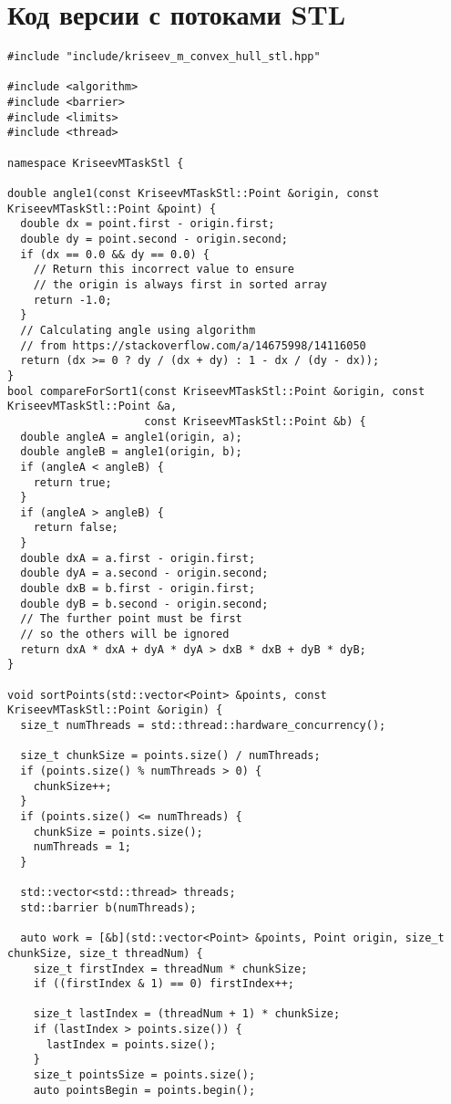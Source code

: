 \documentclass[a4paper]{article}
\begin{document}
\section{Код версии с потоками STL}

\begin{lstlisting}
#include "include/kriseev_m_convex_hull_stl.hpp"

#include <algorithm>
#include <barrier>
#include <limits>
#include <thread>

namespace KriseevMTaskStl {

double angle1(const KriseevMTaskStl::Point &origin, const KriseevMTaskStl::Point &point) {
  double dx = point.first - origin.first;
  double dy = point.second - origin.second;
  if (dx == 0.0 && dy == 0.0) {
    // Return this incorrect value to ensure 
    // the origin is always first in sorted array
    return -1.0;
  }
  // Calculating angle using algorithm 
  // from https://stackoverflow.com/a/14675998/14116050
  return (dx >= 0 ? dy / (dx + dy) : 1 - dx / (dy - dx));
}
bool compareForSort1(const KriseevMTaskStl::Point &origin, const KriseevMTaskStl::Point &a,
                     const KriseevMTaskStl::Point &b) {
  double angleA = angle1(origin, a);
  double angleB = angle1(origin, b);
  if (angleA < angleB) {
    return true;
  }
  if (angleA > angleB) {
    return false;
  }
  double dxA = a.first - origin.first;
  double dyA = a.second - origin.second;
  double dxB = b.first - origin.first;
  double dyB = b.second - origin.second;
  // The further point must be first
  // so the others will be ignored
  return dxA * dxA + dyA * dyA > dxB * dxB + dyB * dyB;
}

void sortPoints(std::vector<Point> &points, const KriseevMTaskStl::Point &origin) {
  size_t numThreads = std::thread::hardware_concurrency();

  size_t chunkSize = points.size() / numThreads;
  if (points.size() % numThreads > 0) {
    chunkSize++;
  }
  if (points.size() <= numThreads) {
    chunkSize = points.size();
    numThreads = 1;
  }

  std::vector<std::thread> threads;
  std::barrier b(numThreads);

  auto work = [&b](std::vector<Point> &points, Point origin, size_t chunkSize, size_t threadNum) {
    size_t firstIndex = threadNum * chunkSize;
    if ((firstIndex & 1) == 0) firstIndex++;

    size_t lastIndex = (threadNum + 1) * chunkSize;
    if (lastIndex > points.size()) {
      lastIndex = points.size();
    }
    size_t pointsSize = points.size();
    auto pointsBegin = points.begin();
    

\end{lstlisting}
\end{document}
